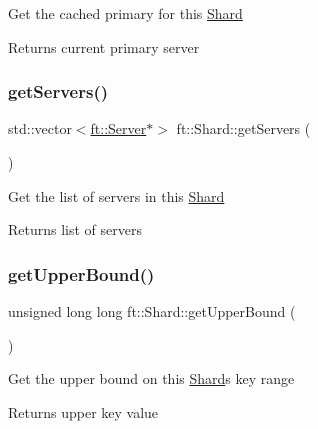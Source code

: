 Get the cached primary for this \mbox{\hyperlink{classft_1_1Shard}{Shard}}

\begin{DoxyReturn}{Returns}
current primary server 
\end{DoxyReturn}
\mbox{\label{classft_1_1Shard_ac06fd0bca4f4254d114401ecb58d744f}} 
\subsubsection{\texorpdfstring{get\+Servers()}{getServers()}}
{\footnotesize\ttfamily std\+::vector$<$\mbox{\hyperlink{classft_1_1Server}{ft\+::\+Server}}$\ast$$>$ ft\+::\+Shard\+::get\+Servers (\begin{DoxyParamCaption}{ }\end{DoxyParamCaption})\hspace{0.3cm}{\ttfamily [inline]}}

Get the list of servers in this \mbox{\hyperlink{classft_1_1Shard}{Shard}}

\begin{DoxyReturn}{Returns}
list of servers 
\end{DoxyReturn}
\mbox{\label{classft_1_1Shard_adf483639946d24a658d2e07a498e08b2}} 
\subsubsection{\texorpdfstring{get\+Upper\+Bound()}{getUpperBound()}}
{\footnotesize\ttfamily unsigned long long ft\+::\+Shard\+::get\+Upper\+Bound (\begin{DoxyParamCaption}{ }\end{DoxyParamCaption})\hspace{0.3cm}{\ttfamily [inline]}}

Get the upper bound on this \mbox{\hyperlink{classft_1_1Shard}{Shard}}\textquotesingle{}s key range

\begin{DoxyReturn}{Returns}
upper key value 
\end{DoxyReturn}
\mbox{\label{classft_1_1Shard_a9a850b8347f8be6b939f00ee91463da7}} 
